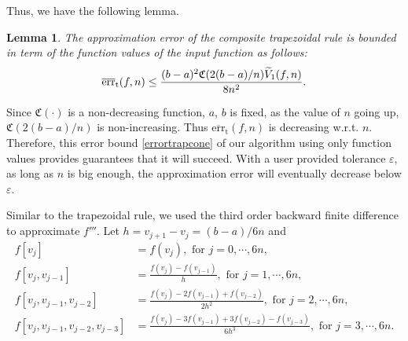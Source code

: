\documentclass{iitthesis}
\DeclareMathOperator{\Var}{Var}
\newtheorem{lem}{Lemma}
\theoremstyle{definition}
\theoremstyle{remark}
\begin{document}
Thus, we have the following lemma.
\begin{lem}\label{lemmaerrorboundtrap}
    The approximation error of the composite trapezoidal rule is bounded in term of the function values of the input function as follows:
    \begin{equation}\label{errortrapcone}
      \overline{\textup{err}}_{\text{t}}(f,n)\leq \frac{(b-a)^2\mathfrak{C}(2(b-a)/n)\widetilde{V}_1(f,n)}{8n^2}.
    \end{equation}
\end{lem}

Since $\mathfrak{C}(\cdot)$ is a non-decreasing function, $a$, $b$ is fixed, as the value of $n$ going up, $\mathfrak{C}(2(b-a)/n)$ is non-increasing. Thus $\overline{\text{err}}_{\text{t}}(f,n)$ is decreasing w.r.t. $n$. Therefore, this error bound \eqref{errortrapcone} of our algorithm using only function values provides guarantees that it will succeed. With a user provided tolerance $\varepsilon$, as long as $n$ is big enough, the approximation error will eventually decrease below $\varepsilon$.


Similar to the trapezoidal rule, we used the third order backward finite difference to approximate $f'''$. Let $h=v_{j+1}-v_{j}=(b-a)/6n$ and
\begin{align*}
  f[v_{j}]&=f(v_{j}), \text{ for } j=0,\cdots, 6n,\\
  f[v_{j},v_{j-1}]&=\frac{f(v_{j})-f(v_{j-1})}{h},\text{ for } j=1, \cdots, 6n,\\
  f[v_{j},v_{j-1},v_{j-2}]&=\frac{f(v_{j})-2f(v_{j-1})+f(v_{j-2})}{2h^2},\text{ for } j=2, \cdots, 6n,\\
  f[v_{j},v_{j-1},v_{j-2},v_{j-3}]&=\frac{f(v_{j})-3f(v_{j-1})+3f(v_{j-2})-f(v_{j-3})}{6h^3}, \text{ for } j=3, \cdots, 6n.
\end{align*}

\end{document}

